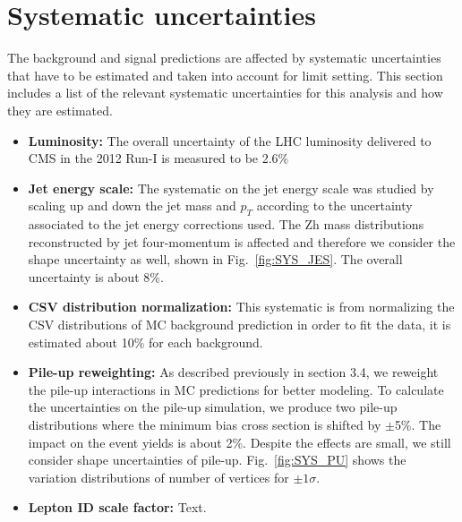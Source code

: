 
\section{Systematic uncertainties}
The background and signal predictions are affected by systematic uncertainties that have to be estimated and taken into account for limit setting. This section includes a list of the relevant systematic uncertainties for this analysis and how they are estimated.

\begin{itemize}
\item \textbf{Luminosity:} The overall uncertainty of the LHC luminosity delivered to CMS in the 2012 Run-I is measured to be 2.6\%\cite{lumi}
\item \textbf{Jet energy scale:} The systematic on the jet energy scale was studied by scaling up and down the jet mass and $p_{T}$ according to the uncertainty associated to the jet energy corrections used. The Zh mass distributions reconstructed by jet four-momentum is affected and therefore we consider the shape uncertainty as well, shown in Fig.~\ref{fig:SYS_JES}. The overall uncertainty is about 8\%.
\item \textbf{CSV distribution normalization:} This systematic is from normalizing the CSV distributions of MC background prediction in order to fit the data, it is estimated about 10\% for each background.
\item \textbf{Pile-up reweighting:} As described previously in section 3.4, we reweight the pile-up interactions in MC predictions for better modeling. To calculate the uncertainties on the pile-up simulation, we produce two pile-up distributions where the minimum bias cross section is shifted by $\pm$5\%\cite{PileupError}. The impact on the event yields is about 2\%. Despite the effects are small, we still consider shape uncertainties of pile-up. Fig.~\ref{fig:SYS_PU} shows the variation distributions of number of vertices for $\pm1\sigma$.
\item \textbf{Lepton ID scale factor:} Text.
\end{itemize}

